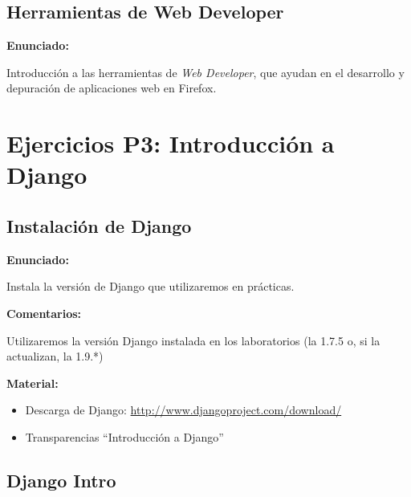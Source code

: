\subsection{Herramientas de Web Developer}
\label{subsec:inst-web-developer}

\textbf{Enunciado:}

Introducción a las herramientas de \emph{Web Developer}, que ayudan en el desarrollo
y depuración de aplicaciones web en Firefox.

\section{Ejercicios P3: Introducción a Django}

\subsection{Instalación de Django}
\label{subsec:django-install}

\textbf{Enunciado:}

Instala la versión de Django que utilizaremos en prácticas.

\textbf{Comentarios:}

Utilizaremos la versión Django instalada en los laboratorios (la 1.7.5 o, si 
la actualizan, la 1.9.*)

\textbf{Material:}

\begin{itemize}
\item Descarga de Django: \url{http://www.djangoproject.com/download/}
\item Transparencias ``Introducción a Django''
\end{itemize}


\subsection{Django Intro}
\label{subsec:django-intro}

